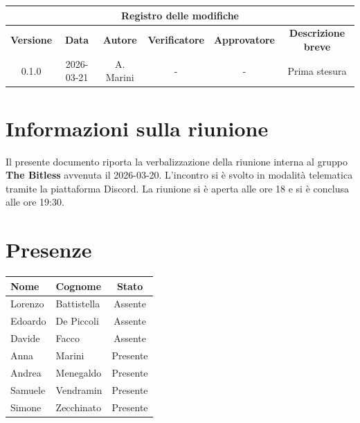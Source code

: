 \documentclass[a4paper, 10pt, colorlinks=true, linkcolor=black, urlcolor=blue, citecolor=blue, hidelinks]{article}
\begin{document}
\newcommand{\tipoverbale}{interno}
\newcommand{\dataverbale}{2026-03-20}
\newcommand{\dataversione}{2026-03-21}
\newcommand{\versione}{0.1.0}
\newcommand{\stato}{Revisione}
\newcommand{\destinatari}{The Bitless, prof. Tullio Vardanega, prof. Riccardo Cardin}

\begin{titlepage}

\end{titlepage}

\newpage
{}

\begin{center}
    \begin{tabular}{|c|c|c|c|c|c|}
        \hline
        \multicolumn{6}{|c|}{\textbf{Registro delle modifiche}} \\
        \hline
        \textbf{Versione} & \textbf{Data} & \textbf{Autore} & \textbf{Verificatore} & \textbf{Approvatore} & \textbf{Descrizione breve} \\
        \hline 
        0.1.0 & 2026-03-21 & A. Marini & - & - & Prima stesura \\
        \hline
    \end{tabular}
\end{center}

\newpage
\tableofcontents 

\newpage
\section{Informazioni sulla riunione}
Il presente documento riporta la verbalizzazione della riunione interna al gruppo \textbf{The Bitless} avvenuta il \dataverbale{}. L'incontro si è svolto in modalità telematica tramite la piattaforma Discord. La riunione si è aperta alle ore 18 e si è conclusa alle ore 19:30.

\section{Presenze}
\begin{center}
\begin{tabular}{|l|l|c|}
\hline
\textbf{Nome} & \textbf{Cognome} & \textbf{Stato} \\
\hline
Lorenzo & Battistella & Assente \\
Edoardo & De Piccoli & Assente \\
Davide & Facco & Assente \\
Anna & Marini & Presente \\
Andrea & Menegaldo & Presente \\
Samuele & Vendramin & Presente \\
Simone & Zecchinato & Presente \\
\hline
\end{tabular}
\end{center}
\end{document}
